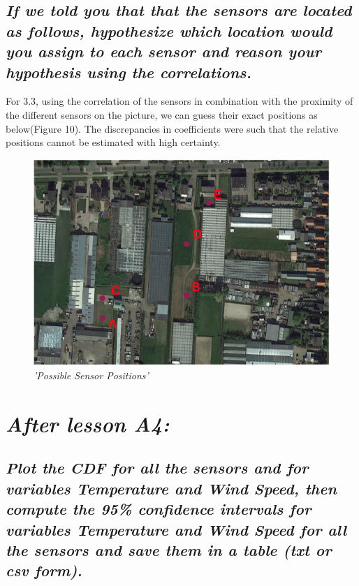 \documentclass[a4paper,12pt]{article}
\begin{document}
\subsection{\it If we told you that that the sensors are located as follows, hypothesize which location would you assign to each sensor and reason your hypothesis using the correlations.}




For 3.3, using the correlation of the sensors in combination with the proximity of the different sensors on the picture, we can guess their exact positions as below(Figure 10). 
The discrepancies in coefficients were such that the relative positions cannot 
be estimated with high certainty.



\begin{figure}[H]
\centering
\includegraphics[width=\textwidth]{Graphs/SensorsSketch.png}
\caption{\it'Possible Sensor Positions'}
\end{figure}




\section{\it After lesson A4:}
\subsection{\it Plot the CDF for all the sensors and for variables Temperature and Wind Speed, then compute the 95\% confidence intervals for variables Temperature and Wind Speed for all the sensors and save them in a table (txt or csv form).}
\end{document}

